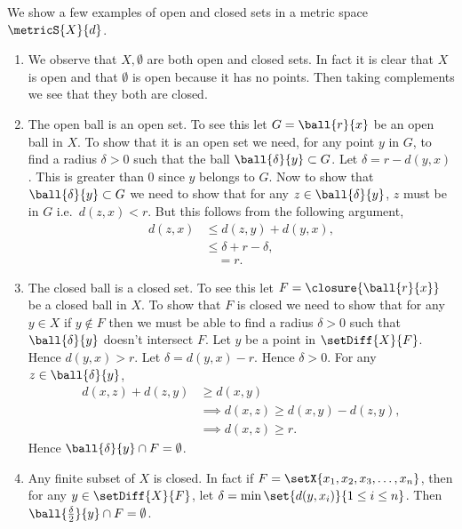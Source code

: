 \begin{Example}\label{ex:open_closed_set}
    We show a few examples of open and closed sets in a metric space $\metricS{X}{d}$.
    \begin{enumerate}
	\item
	    We observe that $X,\emptyset$ are both open and closed sets. In fact it is clear that $X$ is open
	    and that $\emptyset$ is open because it has no points. Then taking complements we see that they
	    both are closed.
	\item
	    The open ball is an open set. To see this let $G = \ball{r}{x}$ be an open ball in $X$. To show that
	    it is an open set we need, for any point $y$ in $G$, to find a radius $\delta > 0$ such that the
	    ball $\ball{\delta}{y} \subset G$. Let $\delta = r - d(y,x)$. This is greater than $0$ since $y$
	    belongs to $G$. Now to show that $\ball{\delta}{y} \subset G$ we need to show that for any $z \in
	    \ball{\delta}{y}$, $z$ must be in $G$ i.e.~$d(z,x) < r$. But this follows from the following
	    argument,
	    \begin{align*}
		d(z,x) &\leq d(z,y) + d(y,x),\\
		& \leq \delta + r - \delta, \\
		&\quad = r.
	    \end{align*}
	\item
	    The closed ball is a closed set. To see this let $F = \closure{\ball{r}{x}}$ be a closed ball in
	    $X$. To show that $F$ is closed we need to show that for any $y\in X$ if $y \not \in F$ then we
	    must be able to find a radius $\delta > 0$ such that $\ball{\delta}{y}$ doesn't intersect $F$. Let
	    $y$ be a point in $\setDiff{X}{F}$. Hence $d(y,x) > r$. Let $\delta = d(y,x) - r$. Hence $\delta >
	    0$. For any $z \in \ball{\delta}{y}$,
	    \begin{align*}
		d(x,z) + d(z,y) &\geq d(x,y)\\
		&\implies d(x,z) \geq d(x,y) - d(z,y), \\
		&\implies d(x,z) \geq r.
	    \end{align*}
	    Hence $\ball{\delta}{y}\cap F = \emptyset$.
	\item
	    Any finite subset of $X$ is closed. In fact if $F =\setX{x_1,x_2,x_3,\ldots,x_n}$, then for any
	    $y\in \setDiff{X}{F}$, let $\delta = \min\set{d(y,x_i)}{1\leq i \leq n}$. Then
	    $\ball{\frac{\delta}{2}}{y} \cap F = \emptyset$.
    \end{enumerate}
\end{Example}

